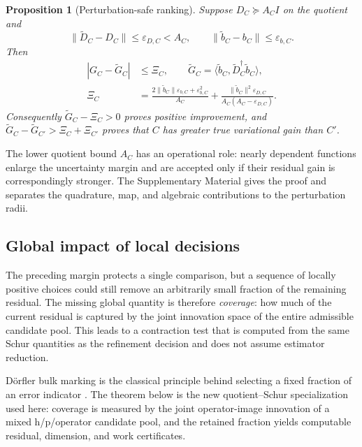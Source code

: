 \documentclass[11pt]{article}
\newtheorem{proposition}[theorem]{Proposition}
\numberwithin{algorithm}{section}
\theoremstyle{definition}\newtheorem{definition}[theorem]{Definition}
\theoremstyle{remark}\newtheorem{remark}[theorem]{Remark}
\begin{document}
\begin{proposition}[Perturbation-safe ranking]
\label{prop:main-safe-ranking}
Suppose $D_C\succeq A_CI$ on the quotient and
\[
 \|\widetilde D_C-D_C\|\leq\varepsilon_{D,C}<A_C,
 \qquad
 \|\widetilde b_C-b_C\|\leq\varepsilon_{b,C}.
\]
Then
\begin{align}
 |G_C-\widetilde G_C|&\leq\Xi_C,\qquad
 \widetilde G_C=\langle\widetilde b_C,
                         \widetilde D_C^\dagger\widetilde b_C\rangle,\\
 \Xi_C&=
 \frac{2\|\widetilde b_C\|\varepsilon_{b,C}+\varepsilon_{b,C}^2}{A_C}
 +\frac{\|\widetilde b_C\|^2\varepsilon_{D,C}}
 {A_C(A_C-\varepsilon_{D,C})}.
 \label{eq:main-ranking-margin}
\end{align}
Consequently $\widetilde G_C-\Xi_C>0$ proves positive improvement, and
$\widetilde G_C-\widetilde G_{C'}>\Xi_C+\Xi_{C'}$ proves that $C$ has greater
true variational gain than $C'$.
\end{proposition}
The lower quotient bound $A_C$ has an operational role: nearly dependent
functions enlarge the uncertainty margin and are accepted only if their
residual gain is correspondingly stronger.  The Supplementary Material gives
the proof and separates the
quadrature, map, and algebraic contributions to the perturbation radii.

\subsection{Global impact of local decisions}
The preceding margin protects a single comparison, but a sequence of locally
positive choices could still remove an arbitrarily small fraction of the
remaining residual.  The missing global quantity is therefore \emph{coverage}:
how much of the current residual is captured by the joint innovation space of
the entire admissible candidate pool.  This leads to a contraction test that
is computed from the same Schur quantities as the refinement decision and does
not assume estimator reduction.

D\"orfler bulk marking is the classical principle behind selecting a fixed
fraction of an error indicator \cite{dorfler1996}.  The theorem below is the
new quotient--Schur specialization used here: coverage is measured by the
joint operator-image innovation of a mixed h/p/operator candidate pool, and
the retained fraction yields computable residual, dimension, and work
certificates.
\end{document}
